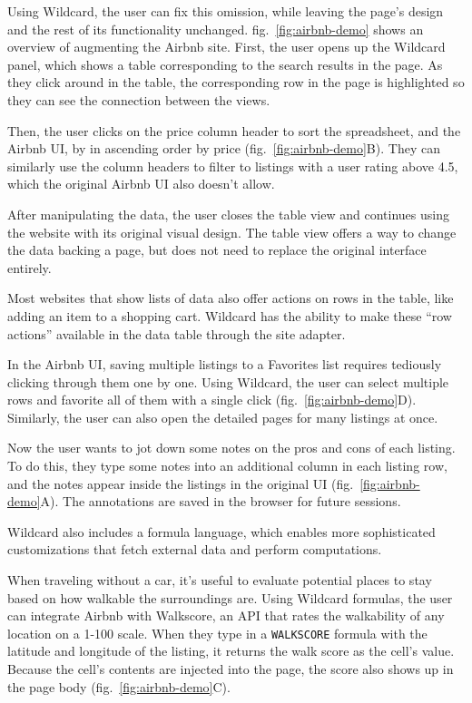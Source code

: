 \documentclass[english,submission]{programming}
\begin{document}
Using Wildcard, the user can fix this omission, while leaving the page's
design and the rest of its functionality unchanged.{
fig.~\ref{fig:airbnb-demo} shows an overview of augmenting the Airbnb
site.} First, the user opens up the Wildcard panel, which shows a table
corresponding to the search results in the page. As they click around in
the table, the corresponding row in the page is highlighted so they can
see the connection between the views.

Then, the user clicks on the price column header to sort the
spreadsheet, and the Airbnb UI, by in ascending order by price{
(fig.~\ref{fig:airbnb-demo}B)}. They can similarly use the column
headers to filter to listings with a user rating above 4.5, which the
original Airbnb UI also doesn't allow.

After manipulating the data, the user closes the table view and
continues using the website with its original visual design. The table
view offers a way to change the data backing a page, but does not need
to replace the original interface entirely.

Most websites that show lists of data also offer actions on rows in the
table, like adding an item to a shopping cart. Wildcard has the ability
to make these ``row actions'' available in the data table through the
site adapter.

In the Airbnb UI, saving multiple listings to a Favorites list requires
tediously clicking through them one by one. Using Wildcard, the user can
select multiple rows and favorite all of them with a single click{
(fig.~\ref{fig:airbnb-demo}D)}. Similarly, the user can also open the
detailed pages for many listings at once.

Now the user wants to jot down some notes on the pros and cons of each
listing. To do this, they type some notes into an additional column in
each listing row, and the notes appear inside the listings in the
original UI{ (fig.~\ref{fig:airbnb-demo}A)}. The annotations are saved
in the browser for future sessions.

Wildcard also includes a formula language, which enables more
sophisticated customizations that fetch external data and perform
computations.

When traveling without a car, it's useful to evaluate potential places
to stay based on how walkable the surroundings are. Using Wildcard
formulas, the user can integrate Airbnb with Walkscore, an API that
rates the walkability of any location on a 1-100 scale. When they type
in a \texttt{WALKSCORE} formula with the latitude and longitude of the
listing, it returns the walk score as the cell's value. Because the
cell's contents are injected into the page, the score also shows up in
the page body{ (fig.~\ref{fig:airbnb-demo}C)}.
\end{document}
